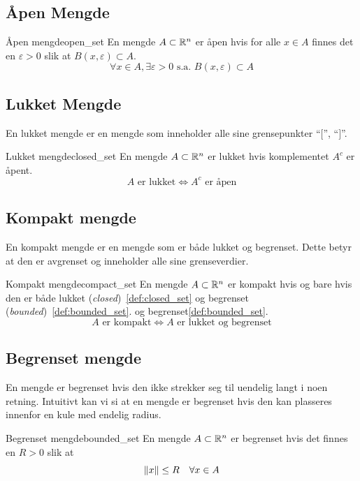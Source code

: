 \subsection{Åpen Mengde}

\begin{definition}{Åpen mengde}{open_set}
	En mengde \(A \subset \mathbb{R}^n\) er åpen hvis for alle \(x \in A\) finnes det en \(\varepsilon > 0\) slik at \(B(x, \varepsilon) \subset A\).
	\[
		\forall x \in A, \exists \varepsilon > 0 \text{ s.a. } B(x, \varepsilon) \subset A
	\]
\end{definition}

\subsection{Lukket Mengde}
En lukket mengde er en mengde som inneholder alle sine grensepunkter \enquote{\( [ \)}, \enquote{\( ] \)}.
\begin{definition}{Lukket mengde}{closed_set}
	En mengde \(A \subset \mathbb{R}^n\) er lukket hvis komplementet \(A^c\) er åpent.
	\[
		A \text{ er lukket} \Leftrightarrow A^c \text{ er åpen}
	\]
\end{definition}

\subsection{Kompakt mengde}
En kompakt mengde er en mengde som er både lukket og begrenset. Dette betyr at den er avgrenset og inneholder alle sine grenseverdier.

\begin{definition}{Kompakt mengde}{compact_set}
	En mengde \(A \subset \mathbb{R}^n\) er kompakt hvis og bare hvis den er både lukket (\emph{closed})~\ref{def:closed_set} og begrenset (\emph{bounded})~\ref{def:bounded_set}.
	og begrenset\ref{def:bounded_set}.
		\[
			A \text{ er kompakt} \Leftrightarrow A \text{ er lukket og begrenset}
		\]
\end{definition}

\subsection{Begrenset mengde}
En mengde er begrenset hvis den ikke strekker seg til uendelig langt i noen retning.
Intuitivt kan vi si at en mengde er begrenset hvis den kan plasseres innenfor en kule med endelig radius.

\begin{definition}{Begrenset mengde}{bounded_set}
	En mengde \(A \subset \mathbb{R}^n\) er begrenset hvis det finnes en \(R > 0\) slik at
	\[
		\lVert x\rVert \leq R \quad \forall x \in A
	\]
\end{definition}

